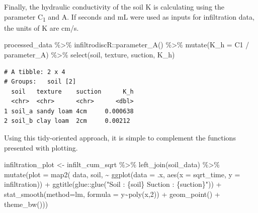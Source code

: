 \documentclass[
]{article}
\newenvironment{Shaded}{\begin{snugshade}}{\end{snugshade}}
\newcommand{\AttributeTok}[1]{\textcolor[rgb]{0.40,0.45,0.13}{#1}}
\newcommand{\DecValTok}[1]{\textcolor[rgb]{0.68,0.00,0.00}{#1}}
\newcommand{\FunctionTok}[1]{\textcolor[rgb]{0.28,0.35,0.67}{#1}}
\newcommand{\NormalTok}[1]{\textcolor[rgb]{0.00,0.23,0.31}{#1}}
\newcommand{\OtherTok}[1]{\textcolor[rgb]{0.00,0.23,0.31}{#1}}
\newcommand{\SpecialCharTok}[1]{\textcolor[rgb]{0.37,0.37,0.37}{#1}}
\newcommand{\StringTok}[1]{\textcolor[rgb]{0.13,0.47,0.30}{#1}}
\begin{document}
\newpage{}

Finally, the hydraulic conductivity of the soil K is calculating using
the parameter C\textsubscript{1} and A. If seconds and mL were used as
inputs for infiltration data, the units of K are cm/s.

\begin{Shaded}
\begin{Highlighting}[]
\NormalTok{processed\_data }\SpecialCharTok{\%\textgreater{}\%} 
\NormalTok{  infiltrodiscR}\SpecialCharTok{::}\FunctionTok{parameter\_A}\NormalTok{() }\SpecialCharTok{\%\textgreater{}\%} 
  \FunctionTok{mutate}\NormalTok{(}\AttributeTok{K\_h =}\NormalTok{ C1 }\SpecialCharTok{/}\NormalTok{ parameter\_A) }\SpecialCharTok{\%\textgreater{}\%} 
  \FunctionTok{select}\NormalTok{(soil, texture, suction, K\_h)}
\end{Highlighting}
\end{Shaded}

\begin{verbatim}
# A tibble: 2 x 4
# Groups:   soil [2]
  soil   texture    suction      K_h
  <chr>  <chr>      <chr>      <dbl>
1 soil_a sandy loam 4cm     0.000638
2 soil_b clay loam  2cm     0.00212 
\end{verbatim}

Using this tidy-oriented approach, it is simple to complement the
functions presented with plotting.

\begin{Shaded}
\begin{Highlighting}[]
\NormalTok{infiltration\_plot }\OtherTok{\textless{}{-}} 
\NormalTok{infilt\_cum\_sqrt }\SpecialCharTok{\%\textgreater{}\%} 
  \FunctionTok{left\_join}\NormalTok{(soil\_data) }\SpecialCharTok{\%\textgreater{}\%} 
  \FunctionTok{mutate}\NormalTok{(}\AttributeTok{plot =} \FunctionTok{map2}\NormalTok{(}
\NormalTok{    data, soil, }
    \SpecialCharTok{\textasciitilde{}} \FunctionTok{ggplot}\NormalTok{(}\AttributeTok{data =}\NormalTok{ .x, }\FunctionTok{aes}\NormalTok{(}\AttributeTok{x =}\NormalTok{ sqrt\_time, }\AttributeTok{y =}\NormalTok{ infiltration)) }\SpecialCharTok{+}
      \FunctionTok{ggtitle}\NormalTok{(glue}\SpecialCharTok{::}\FunctionTok{glue}\NormalTok{(}\StringTok{"Soil : \{soil\}}
\StringTok{                   Suction : \{suction\}"}\NormalTok{)) }\SpecialCharTok{+}
      \FunctionTok{stat\_smooth}\NormalTok{(}\AttributeTok{method=}\StringTok{\textquotesingle{}lm\textquotesingle{}}\NormalTok{, }\AttributeTok{formula =}\NormalTok{ y}\SpecialCharTok{\textasciitilde{}}\FunctionTok{poly}\NormalTok{(x,}\DecValTok{2}\NormalTok{)) }\SpecialCharTok{+}
      \FunctionTok{geom\_point}\NormalTok{() }\SpecialCharTok{+}
      \FunctionTok{theme\_bw}\NormalTok{()))}
\end{Highlighting}
\end{Shaded}
\end{document}
